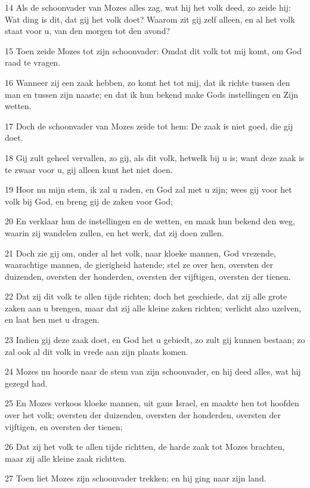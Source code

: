 \par 14 Als de schoonvader van Mozes alles zag, wat hij het volk deed, zo zeide hij: Wat ding is dit, dat gij het volk doet? Waarom zit gij zelf alleen, en al het volk staat voor u, van den morgen tot den avond?
\par 15 Toen zeide Mozes tot zijn schoonvader: Omdat dit volk tot mij komt, om God raad te vragen.
\par 16 Wanneer zij een zaak hebben, zo komt het tot mij, dat ik richte tussen den man en tussen zijn naaste; en dat ik hun bekend make Gods instellingen en Zijn wetten.
\par 17 Doch de schoonvader van Mozes zeide tot hem: De zaak is niet goed, die gij doet.
\par 18 Gij zult geheel vervallen, zo gij, als dit volk, hetwelk bij u is; want deze zaak is te zwaar voor u, gij alleen kunt het niet doen.
\par 19 Hoor nu mijn stem, ik zal u raden, en God zal met u zijn; wees gij voor het volk bij God, en breng gij de zaken voor God;
\par 20 En verklaar hun de instellingen en de wetten, en maak hun bekend den weg, waarin zij wandelen zullen, en het werk, dat zij doen zullen.
\par 21 Doch zie gij om, onder al het volk, naar kloeke mannen, God vrezende, waarachtige mannen, de gierigheid hatende; stel ze over hen, oversten der duizenden, oversten der honderden, oversten der vijftigen, oversten der tienen.
\par 22 Dat zij dit volk te allen tijde richten; doch het geschiede, dat zij alle grote zaken aan u brengen, maar dat zij alle kleine zaken richten; verlicht alzo uzelven, en laat hen met u dragen.
\par 23 Indien gij deze zaak doet, en God het u gebiedt, zo zult gij kunnen bestaan; zo zal ook al dit volk in vrede aan zijn plaats komen.
\par 24 Mozes nu hoorde naar de stem van zijn schoonvader, en hij deed alles, wat hij gezegd had.
\par 25 En Mozes verkoos kloeke mannen, uit gans Israel, en maakte hen tot hoofden over het volk; oversten der duizenden, oversten der honderden, oversten der vijftigen, en oversten der tienen;
\par 26 Dat zij het volk te allen tijde richtten, de harde zaak tot Mozes brachten, maar zij alle kleine zaak richtten.
\par 27 Toen liet Mozes zijn schoonvader trekken; en hij ging naar zijn land.

